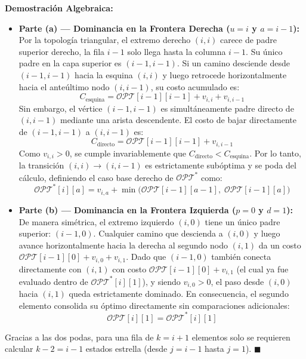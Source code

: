 \textbf{Demostración Algebraica:}
\begin{itemize}
    \item \textbf{Parte (a) — Dominancia en la Frontera Derecha ($u = i$ y $a = i-1$):} \\
    Por la topología triangular, el extremo derecho $(i, i)$ carece de padre superior derecho, la fila $i-1$ solo llega hasta la columna $i-1$. Su único padre en la capa superior es $(i-1, i-1)$. Si un camino desciende desde $(i-1, i-1)$ hacia la esquina $(i, i)$ y luego retrocede horizontalmente hacia el anteúltimo nodo $(i, i-1)$, su costo acumulado es:
    \[
        C_{\text{esquina}} = \mathcal{OPT}[i-1][i-1] + v_{i,i} + v_{i,i-1}
    \]
    Sin embargo, el vértice $(i-1, i-1)$ es simultáneamente padre directo de $(i, i-1)$ mediante una arista descendente. El costo de bajar directamente de $(i-1, i-1)$ a $(i, i-1)$ es:
    \[
        C_{\text{directo}} = \mathcal{OPT}[i-1][i-1] + v_{i,i-1}
    \]
    Como $v_{i,i} > 0$, se cumple invariablemente que $C_{\text{directo}} < C_{\text{esquina}}$. Por lo tanto, la transición $(i, i) \to (i, i-1)$ es estrictamente subóptima y se poda del cálculo, definiendo el caso base derecho de $\mathcal{OPT}^*$ como:
    \[
        \mathcal{OPT}^*[i][a] = v_{i,a} + \min\big(\mathcal{OPT}[i-1][a-1], \; \mathcal{OPT}[i-1][a]\big)
    \]

    \item \textbf{Parte (b) — Dominancia en la Frontera Izquierda ($p = 0$ y $d = 1$):} \\
    De manera simétrica, el extremo izquierdo $(i, 0)$ tiene un único padre superior: $(i-1, 0)$. Cualquier camino que descienda a $(i, 0)$ y luego avance horizontalmente hacia la derecha al segundo nodo $(i, 1)$ da un costo $\mathcal{OPT}[i-1][0] + v_{i,0} + v_{i,1}$. Dado que $(i-1, 0)$ también conecta directamente con $(i, 1)$ con costo $\mathcal{OPT}[i-1][0] + v_{i,1}$ (el cual ya fue evaluado dentro de $\mathcal{OPT}^*[i][1]$), y siendo $v_{i,0} > 0$, el paso desde $(i,0)$ hacia $(i,1)$ queda estrictamente dominado. En consecuencia, el segundo elemento consolida su óptimo directamente sin comparaciones adicionales:
    \[
        \mathcal{OPT}[i][1] = \mathcal{OPT}^*[i][1]
    \]
\end{itemize}
Gracias a las dos podas, para una fila de $k = i+1$ elementos solo se requieren calcular $k - 2 = i - 1$ estados estrella (desde $j = i-1$ hasta $j = 1$). $\blacksquare$

